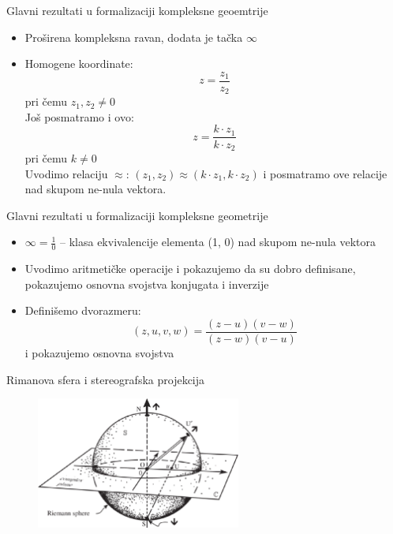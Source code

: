 \documentclass{beamer}
\begin{document}
\begin{frame}{Glavni rezultati u formalizaciji kompleksne geoemtrije}
\begin{itemize}[<+->]
\item Pro\v sirena kompleksna ravan, dodata je ta\v cka $\infty$
\item Homogene koordinate:
      $$z = \frac{z_1}{z_2}$$
      pri \v cemu $z_1, z_2 \neq 0$ \\
      Jo\v s posmatramo i ovo:
      $$z = \frac{k\cdot z_1}{k \cdot z_2}$$
      pri \v cemu $k \neq 0$ \\
      Uvodimo relaciju $\approx$: $(z_1, z_2) \approx (k\cdot z_1, k\cdot z_2)$ 
i posmatramo  ove relacije nad skupom ne-nula vektora.
\end{itemize}
\end{frame}

\begin{frame}{Glavni rezultati u formalizaciji kompleksne geometrije}
\begin{itemize}[<+->]
\item $\infty = \frac{1}{0}$ -- klasa ekvivalencije elementa (1, 0) nad skupom ne-nula vektora
\item Uvodimo aritmeti\v cke operacije i pokazujemo da su dobro definisane, 
pokazujemo osnovna svojstva konjugata i inverzije
\item Defini\v semo dvorazmeru: 
      $$(z, u, v, w) = \frac{(z-u)(v-w)}{(z-w)(v-u)}$$
      i pokazujemo osnovna svojstva     
\end{itemize}
\end{frame}


\begin{frame}{Rimanova sfera i stereografska projekcija}
\begin{figure}[!h]
\begin{center}
\includegraphics[width=0.6\textwidth]{riman.eps}
\end{center}
\end{figure}
\end{frame}
\end{document}
